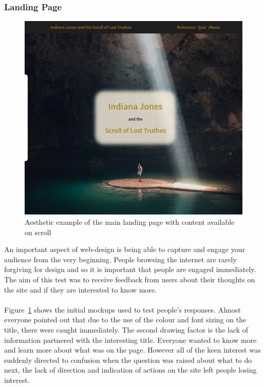 \subsubsection{Landing Page}
\begin{figure}[H]
	\centering
	\includegraphics[width=0.8\linewidth]{homepage}
	\caption{Aesthetic example of the main landing page with content available on scroll}\label{fig:homepage}
\end{figure}
An important aspect of web-design is being able to capture and engage your audience from the very beginning. People browsing the internet are rarely forgiving for design and so it is important that people are engaged immediately. The aim of this test was to receive feedback from users about their thoughts on the site and if they are interested to know more.\\\\
Figure~\ref{fig:homepage} shows the initial mockups used to test people's responses. Almost everyone pointed out that due to the use of the colour and font sizing on the title, there were caught immediately. The second drawing factor is the lack of information partnered with the interesting title. Everyone wanted to know more and learn more about what was on the page. However all of the keen interest was suddenly directed to confusion when the question was raised about what to do next, the lack of direction and indication of actions on the site left people losing interest.

